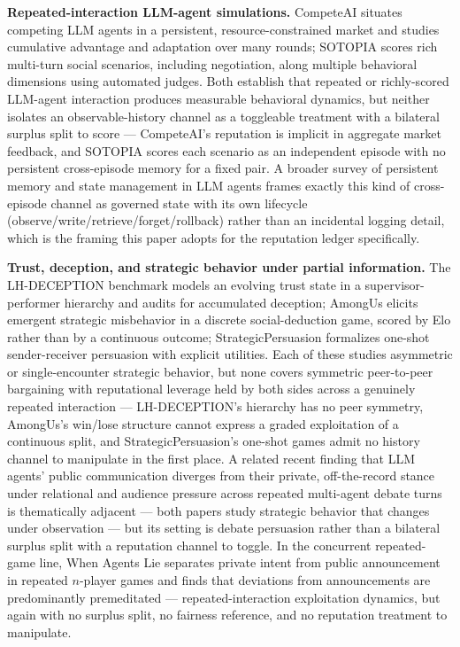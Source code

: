 \documentclass[11pt]{article}
\begin{document}
\textbf{Repeated-interaction LLM-agent simulations.} CompeteAI \citep{competeai} situates competing LLM agents in a persistent, resource-constrained market and studies cumulative advantage and adaptation over many rounds; SOTOPIA \citep{sotopia} scores rich multi-turn social scenarios, including negotiation, along multiple behavioral dimensions using automated judges. Both establish that repeated or richly-scored LLM-agent interaction produces measurable behavioral dynamics, but neither isolates an observable-history channel as a toggleable treatment with a bilateral surplus split to score --- CompeteAI's reputation is implicit in aggregate market feedback, and SOTOPIA scores each scenario as an independent episode with no persistent cross-episode memory for a fixed pair. A broader survey of persistent memory and state management in LLM agents \citep{alwaysonagents2606} frames exactly this kind of cross-episode channel as governed state with its own lifecycle (observe/write/retrieve/forget/rollback) rather than an incidental logging detail, which is the framing this paper adopts for the reputation ledger specifically.

\textbf{Trust, deception, and strategic behavior under partial information.} The LH-DECEPTION benchmark \citep{lhdeception} models an evolving trust state in a supervisor-performer hierarchy and audits for accumulated deception; AmongUs \citep{amongus} elicits emergent strategic misbehavior in a discrete social-deduction game, scored by Elo rather than by a continuous outcome; StrategicPersuasion \citep{strategicpersuasion} formalizes one-shot sender-receiver persuasion with explicit utilities. Each of these studies asymmetric or single-encounter strategic behavior, but none covers symmetric peer-to-peer bargaining with reputational leverage held by both sides across a genuinely repeated interaction --- LH-DECEPTION's hierarchy has no peer symmetry, AmongUs's win/lose structure cannot express a graded exploitation of a continuous split, and StrategicPersuasion's one-shot games admit no history channel to manipulate in the first place. A related recent finding that LLM agents' public communication diverges from their private, off-the-record stance under relational and audience pressure across repeated multi-agent debate turns \citep{nooneswatchingdebates2607} is thematically adjacent --- both papers study strategic behavior that changes under observation --- but its setting is debate persuasion rather than a bilateral surplus split with a reputation channel to toggle. In the concurrent repeated-game line, When Agents Lie \citep{whenagentslie2607} separates private intent from public announcement in repeated $n$-player games and finds that deviations from announcements are predominantly premeditated --- repeated-interaction exploitation dynamics, but again with no surplus split, no fairness reference, and no reputation treatment to manipulate.
\end{document}
